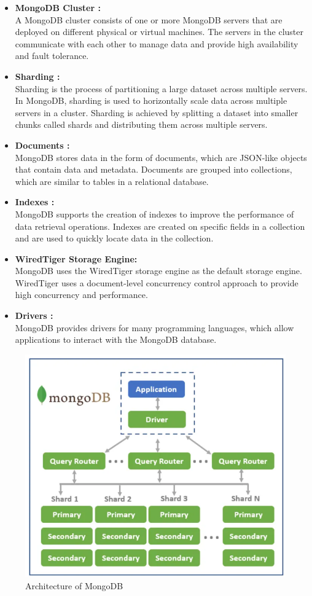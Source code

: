 \documentclass[12pt]{article}
\begin{document}
\begin{itemize}
    \item {\bfseries MongoDB Cluster : \\}
    A MongoDB cluster consists of one or more MongoDB servers that are deployed on different physical or virtual machines. The servers in the cluster communicate with each other to manage data and provide high availability and fault tolerance.
    \item{\bfseries Sharding : \\}
    Sharding is the process of partitioning a large dataset across multiple servers. In MongoDB, sharding is used to horizontally scale data across multiple servers in a cluster. Sharding is achieved by splitting a dataset into smaller chunks called shards and distributing them across multiple servers.
    \item{\bfseries Documents : \\}
    MongoDB stores data in the form of documents, which are JSON-like objects that contain data and metadata. Documents are grouped into collections, which are similar to tables in a relational database.
    \item{\bfseries Indexes : \\}
    MongoDB supports the creation of indexes to improve the performance of data retrieval operations. Indexes are created on specific fields in a collection and are used to quickly locate data in the collection.
    \item{\bfseries WiredTiger Storage Engine: \\}
    MongoDB uses the WiredTiger storage engine as the default storage engine. WiredTiger uses a document-level concurrency control approach to provide high concurrency and performance.
    \item{\bfseries Drivers : \\}
    MongoDB provides drivers for many programming languages, which allow applications to interact with the MongoDB database.
\end{itemize}
\begin{figure}[h!]
    \centering
    \includegraphics[scale = 0.6]{images/MongoDB.png}
    \caption{Architecture of MongoDB}
\end{figure}
\end{document}
